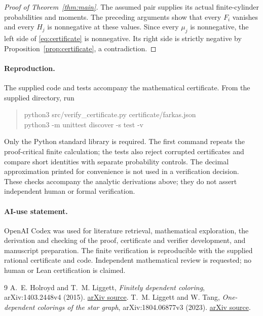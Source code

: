 \documentclass[11pt]{article}
\begin{document}
\begin{proof}[Proof of Theorem~\ref{thm:main}]
The assumed pair supplies its actual finite-cylinder probabilities and
moments. The preceding arguments show that every $F_i$ vanishes and every
$H_j$ is nonnegative at these values. Since every $\mu_j$ is nonnegative,
the left side of \eqref{eq:certificate} is nonnegative. Its right side is
strictly negative by Proposition~\ref{prop:certificate}, a contradiction.
\end{proof}

\paragraph{Reproduction.}
The supplied code and tests accompany the mathematical certificate.
From the supplied directory, run
\begin{quote}\small\ttfamily
python3 src/verify\_certificate.py certificate/farkas.json\\
python3 -m unittest discover -s test -v
\end{quote}
Only the Python standard library is required. The first command repeats the
proof-critical finite calculation; the tests also reject corrupted
certificates and compare short identities with separate probability
controls. The decimal approximation printed for convenience is not used
in a verification decision. These checks accompany the analytic derivations
above; they do not assert independent human or formal verification.

\paragraph{AI-use statement.}
OpenAI Codex was used for literature retrieval, mathematical exploration,
the derivation and checking of the proof, certificate and verifier development,
and manuscript preparation. The finite verification is reproducible with
the supplied rational certificate and code. Independent mathematical review
is requested; no human or Lean certification is claimed.

\begin{thebibliography}{9}
A.~E. Holroyd and T.~M. Liggett,
\emph{Finitely dependent coloring},
arXiv:1403.2448v4 (2015).
\href{https://arxiv.org/abs/1403.2448v4}{arXiv source}.
T.~M. Liggett and W. Tang,
\emph{One-dependent colorings of the star graph},
arXiv:1804.06877v3 (2023).
\href{https://arxiv.org/abs/1804.06877v3}{arXiv source}.
\end{thebibliography}
\end{document}
